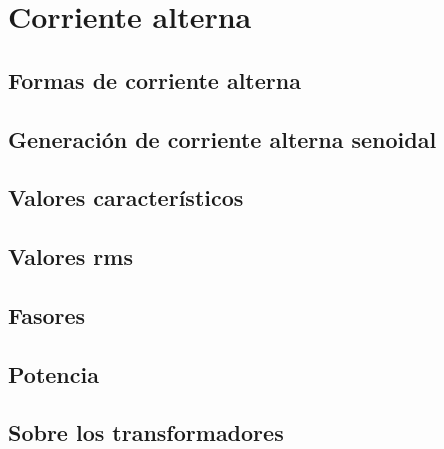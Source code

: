 \chapter{Corriente alterna}

\section{Formas de corriente alterna}

\section{Generación de corriente alterna senoidal}

\section{Valores característicos}

\section{Valores rms}

\section{Fasores}

\section{Potencia}

\section{Sobre los transformadores}